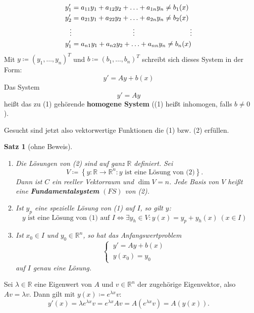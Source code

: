 \documentclass[12pt]{extreport} %
\newcommand{\R}{\mathbb{R}}
\theoremstyle{named}
\theoremstyle{nnamed}
\theoremstyle{itshape}
\newtheorem{satz}[unnamedtheorem]{Satz}
\theoremstyle{normal}
\begin{document}
	\begin{align*}
		y_{1}' & = a_{11} y_{1} + a_{12} y_{2} + \dotsc + a_{1n} y_{n} \neq b_{1}(x) \\
		y_{2}' & = a_{21} y_{1} + a_{22} y_{2} + \dotsc + a_{2n} y_{n} \neq b_{2}(x) \\
		\vdots & \hspace{3.1cm} \vdots \hspace{2.8cm} \vdots \\		
		y_{1}' & = a_{n1} y_{1} + a_{n2} y_{2} + \dotsc + a_{nn} y_{n} \neq b_{n}(x) \\
	\end{align*}
Mit $y \coloneqq \left( y_{1}, \dotsc, y_{n} \right)^{T}$ und $b \coloneqq \left( b_{1}, \dotsc, b_{n} \right)^{T}$ schreibt sich dieses System in der Form:
\begin{equation*}
	y' = A y + b(x) \tag*{(1)}
\end{equation*}
Das System
\begin{equation*}
	y' = A y  \tag*{(2)}
\end{equation*}
hei{\ss}t das zu (1) gehörende \textbf{homogene System} ((1) hei{\ss}t inhomogen, falls $b \neq 0$).

Gesucht sind jetzt also vektorwertige Funktionen die (1) bzw. (2) erfüllen.

\begin{satz}[ohne Beweis] ~\ \label{22.1:satz}
	\begin{enumerate}
		\item Die Lösungen von (2) sind auf ganz $\R$ definiert. Sei 
			$$ V \coloneqq \left\{ y \colon\R \rightarrow \R^{n} : y \text{ ist eine Lösung von (2)} \right\}. $$
			Dann ist $C$ ein reeller Vektorraum und $\dim V = n$. Jede Basis von $V$ hei{\ss}t eine \textbf{Fundamentalsystem} $(FS)$ von (2).
		\item Ist $y_{p}$ eine spezielle Lösung von (1) auf $I$, so gilt $y$:
			$$ y \text{ ist eine Lösung von (1) auf } I \iff \exists y_{h} \in V \colon y(x) = y_{p} + y_{h}(x) ~(x \in I) $$
		\item Ist $x_{0} \in I$ und $y_{0} \in \R^{n}$, so hat das Anfangswertproblem
			$$ \begin{cases} ~ y' = Ay + b(x) \\ ~ y(x_{0}) = y_{0} \end{cases} $$
			auf $I$ genau eine Lösung.
	\end{enumerate}
\end{satz}


Sei $\lambda \in \R$ eine Eigenwert von $A$ und $v \in \R^{n}$ der zugehörige Eigenvektor, also $Av = \lambda v$. Dann gilt mit $y(x) \coloneqq e^{\lambda x} v$:
	$$ y'(x) = \lambda e^{\lambda x} v = e^{\lambda x} Av = A \left( e^{\lambda x} v \right) = A \left( y(x) \right). $$
\end{document}
